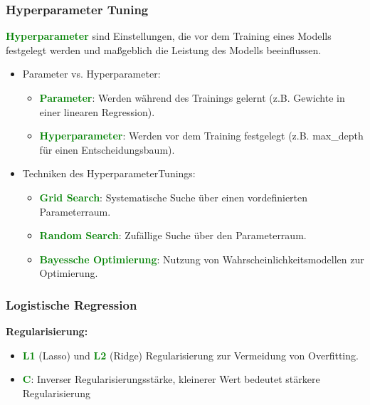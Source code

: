 \documentclass[10pt]{beamer}
\newcommand{\htgreen}[1] {{\bf \textcolor{Green}{#1}}}
\begin{document}
\begin{frame}
  \frametitle{Hyperparameter Tuning}
  {\bf \textcolor{Green}{Hyperparameter} }
  sind Einstellungen, die vor dem Training eines Modells
  festgelegt werden und maßgeblich die Leistung des Modells beeinflussen.

  \vspace{0.5cm}

  \begin{itemize}
    \item Parameter vs. Hyperparameter:
    \begin{itemize}
        \item {\bf \textcolor{Green}{Parameter}}: Werden während des Trainings
          gelernt (z.B. Gewichte in einer linearen Regression).
        \item {\bf \textcolor{Green}{Hyperparameter}}: Werden vor dem
          Training festgelegt (z.B. max\_depth für einen Entscheidungsbaum).
    \end{itemize}

    \vspace{0.5cm}

    \item Techniken des Hyperparameter\-Tunings:
    \begin{itemize}
        \item \htgreen{Grid Search}: Systematische Suche über einen vordefinierten 
          Parameterraum.
        \item \htgreen{Random Search}: Zufällige Suche über den Parameterraum.
        \item \htgreen{Bayessche Optimierung}: Nutzung von 
          Wahrscheinlichkeitsmodellen zur Optimierung.
    \end{itemize}
  \end{itemize}

    
\end{frame}

\begin{frame}
  \frametitle{Logistische Regression}
  {\bf Regularisierung: }
    \begin{itemize}
      \item {\bf \textcolor{Green}{L1}} (Lasso) und \htgreen{L2} (Ridge)
          Regularisierung zur Vermeidung von Overfitting.
        \item {\bf \textcolor{Green}{C}}: Inverser Regularisierungsstärke,
          kleinerer Wert bedeutet stärkere Regularisierung
    \end{itemize}
\end{frame}
\end{document}
